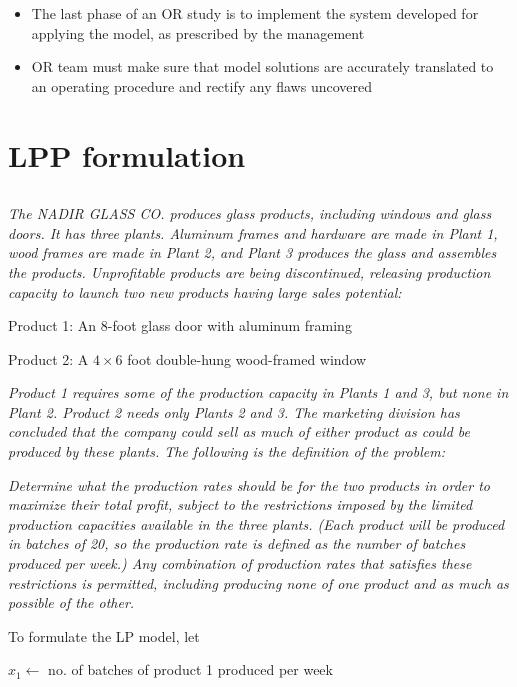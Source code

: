 \documentclass[12pt]{article}
\begin{document}
\begin{itemize}
\item The last phase of an OR study is to implement the system developed for applying the model, as prescribed by the management
\item OR team must make sure that model solutions are accurately translated to an operating procedure and rectify any flaws uncovered
\end{itemize}


\section{LPP formulation}
\label{sec-1}
\subsection{}

\emph{The NADIR GLASS CO. produces glass products, including windows and
glass doors. It has three plants. Aluminum frames and hardware are made in Plant 1, wood
frames are made in Plant 2, and Plant 3 produces the glass and assembles the products.
Unprofitable products are being discontinued, releasing production capacity
to launch two new products having large sales potential:}

Product 1: An 8-foot glass door with aluminum framing

Product 2: A $4 \times 6$ foot double-hung wood-framed window

\emph{Product 1 requires some of the production capacity in Plants 1 and 3, but none in Plant 2.
Product 2 needs only Plants 2 and 3. The marketing division has concluded that the company could sell as much of either product as could be produced by these plants. 
The following is the definition of the problem:}

\emph{Determine what the production rates should be for the two products in order to maximize
their total profit, subject to the restrictions imposed by the limited production capacities
available in the three plants. (Each product will be produced in batches of 20, so the 
production rate is defined as the number of batches produced per week.) Any combination
of production rates that satisfies these restrictions is permitted, including producing none
of one product and as much as possible of the other.}

To formulate the LP model, let

$x_1 \gets$ no. of batches of product 1 produced per week 
\end{document}
